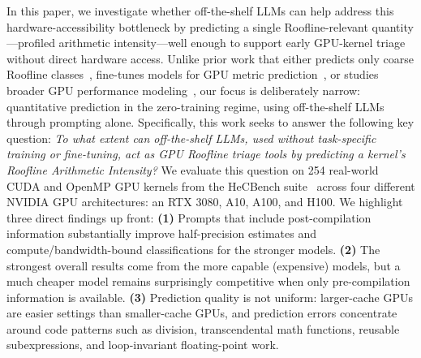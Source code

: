 In this paper, we investigate whether off-the-shelf LLMs can help address this hardware-accessibility bottleneck by predicting a single Roofline-relevant quantity---profiled arithmetic intensity---well enough to support early GPU-kernel triage without direct hardware access.
Unlike prior work that either predicts only coarse Roofline classes~\cite{boletCanLargeLanguage2025}, fine-tunes models for GPU metric prediction~\cite{wangOmniwisePredictingGPU2025}, or studies broader GPU performance modeling~\cite{leeForecastingGPUPerformance2025, nguyen-nhatLLMPerfGPUPerformance2024}, our focus is deliberately narrow: quantitative \rai prediction in the zero-training regime, using off-the-shelf LLMs through prompting alone.
Specifically, this work seeks to answer the following key question:
\textit{To what extent can off-the-shelf LLMs, used without task-specific training or fine-tuning, act as GPU Roofline triage tools by predicting a kernel's Roofline Arithmetic Intensity?}
We evaluate this question on 254 real-world CUDA and OpenMP GPU kernels from the HeCBench suite~\cite{HeCBenchMasterZjinlcf} across four different NVIDIA GPU architectures: an RTX 3080, A10, A100, and H100.
We highlight three direct findings up front:
\textbf{(1)} Prompts that include post-compilation information substantially improve half-precision \rai estimates and compute/bandwidth-bound classifications for the stronger models.
\textbf{(2)} The strongest overall results come from the more capable (expensive) models, but a much cheaper model remains surprisingly competitive when only pre-compilation information is available.
\textbf{(3)} Prediction quality is not uniform: larger-cache GPUs are easier settings than smaller-cache GPUs, and prediction errors concentrate around code patterns such as division, transcendental math functions, reusable subexpressions, and loop-invariant floating-point work.

